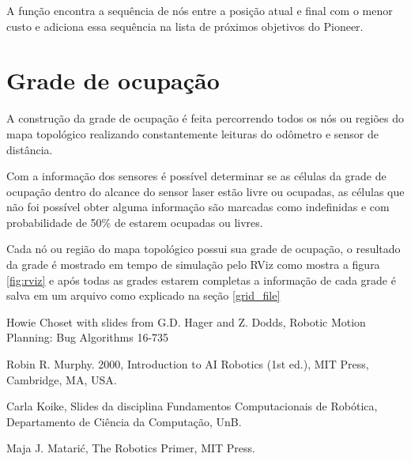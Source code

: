 \documentclass{llncs}
\begin{document}
A função encontra a sequência de nós entre a posição atual e final com o menor custo e adiciona essa sequência na lista de próximos objetivos do Pioneer.




\section{Grade de ocupação} \label{sec:grid}
A construção da grade de ocupação é feita percorrendo todos os nós ou regiões do mapa topológico realizando constantemente leituras do odômetro e sensor de distância.
	
Com a informação dos sensores é possível determinar se as células da grade de ocupação dentro do alcance do sensor laser estão livre ou ocupadas, as células que não foi possível obter alguma informação são marcadas como indefinidas e com probabilidade de 50\% de estarem ocupadas ou livres.

Cada nó ou região do mapa topológico possui sua grade de ocupação, o resultado da grade é mostrado em tempo de simulação pelo RViz como mostra a figura \ref{fig:rviz} e após todas as grades estarem completas a informação de cada grade é salva em um arquivo como explicado na seção \ref{grid_file}





\begin{thebibliography}{9}

	Howie Choset with slides from G.D. Hager and Z. Dodds,
	Robotic Motion Planning: Bug Algorithms
	16-735

	Robin R. Murphy. 2000,
	Introduction to AI Robotics (1st ed.),
	MIT Press, Cambridge, MA, USA. 
	
	Carla Koike,
	Slides da disciplina Fundamentos Computacionais de Robótica,
	Departamento de Ciência da Computação, UnB.
	
	Maja J. Matarić,
	The Robotics Primer,
	MIT Press.

\end{thebibliography}
\end{document}
